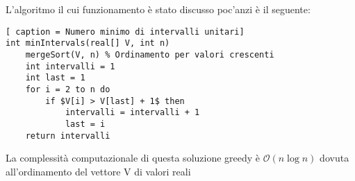\documentclass[../cheatSheetAlgoritmi.tex]{subfiles}
\begin{document}
L'algoritmo il cui funzionamento è stato discusso poc'anzi è il seguente:
\begin{lstlisting}[ caption = Numero minimo di intervalli unitari]
int minIntervals(real[] V, int n)
	mergeSort(V, n) % Ordinamento per valori crescenti
	int intervalli = 1
	int last = 1
	for i = 2 to n do
		if $V[i] > V[last] + 1$ then
			intervalli = intervalli + 1
			last = i
	return intervalli
\end{lstlisting}
La complessità computazionale di questa soluzione greedy è $\mathcal{O}(n \log n)$ dovuta all'ordinamento del vettore V di valori reali
\end{document}
